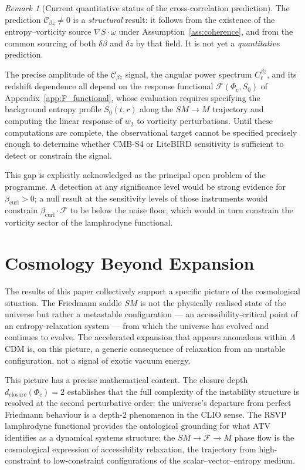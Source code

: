 \documentclass[12pt,a4paper]{article}
\theoremstyle{plain}
\theoremstyle{definition}
\theoremstyle{remark}
\newtheorem{remark}[theorem]{Remark}
\newcommand{\Phic}{\Phi_c}
\newcommand{\SM}{\mathit{SM}}
\newcommand{\Mink}{\mathit{M}}
\newcommand{\Ffam}{\mathcal{F}}
\newcommand{\dclos}{d_{\mathrm{closure}}}
\newcommand{\Cbz}{\mathcal{C}_{\beta z}}
\newcommand{\bcurl}{\beta_{\mathrm{curl}}}
\begin{document}
\begin{remark}[Current quantitative status of the cross-correlation prediction]
\label{rem:Cbz_status}
The prediction $\Cbz\neq 0$ is a \emph{structural} result: it follows from the
existence of the entropy--vorticity source $\nabla S\cdot\omega$ under
Assumption~\ref{ass:coherence}, and from the common sourcing of both $\delta\beta$
and $\delta z$ by that field. It is not yet a \emph{quantitative} prediction.

The precise amplitude of the $\Cbz$ signal, the angular power spectrum
$C_\ell^{\beta z}$, and its redshift dependence all depend on the response
functional $\mathcal{F}(\Phic,S_0)$ of Appendix~\ref{app:F_functional}, whose
evaluation requires specifying the background entropy profile $S_0(t,r)$ along
the $\SM\to\Mink$ trajectory and computing the linear response of $w_2$ to
vorticity perturbations. Until these computations are complete, the observational
target cannot be specified precisely enough to determine whether CMB-S4 or
LiteBIRD sensitivity is sufficient to detect or constrain the signal.

This gap is explicitly acknowledged as the principal open problem of the programme.
A detection at any significance level would be strong evidence for $\bcurl > 0$;
a null result at the sensitivity levels of those instruments would constrain
$\bcurl\cdot\mathcal{F}$ to be below the noise floor, which would in turn
constrain the vorticity sector of the lamphrodyne functional.
\end{remark}

\section{Cosmology Beyond Expansion}
\label{sec:beyond}

The results of this paper collectively support a specific picture of the cosmological
situation. The Friedmann saddle $\SM$ is not the physically realised state of the
universe but rather a metastable configuration --- an accessibility-critical point
of an entropy-relaxation system --- from which the universe has evolved and continues
to evolve. The accelerated expansion that appears anomalous within $\Lambda$CDM is,
on this picture, a generic consequence of relaxation from an unstable configuration,
not a signal of exotic vacuum energy.

This picture has a precise mathematical content. The closure depth $\dclos(\Phic) = 2$
establishes that the full complexity of the instability structure is resolved at the
second perturbative order: the universe's departure from perfect Friedmann behaviour
is a depth-2 phenomenon in the CLIO sense. The RSVP lamphrodyne functional provides
the ontological grounding for what ATV identifies as a dynamical systems structure:
the $\SM\to\Ffam\to\Mink$ phase flow is the cosmological expression of accessibility
relaxation, the trajectory from high-constraint to low-constraint configurations of
the scalar--vector--entropy medium.
\end{document}
